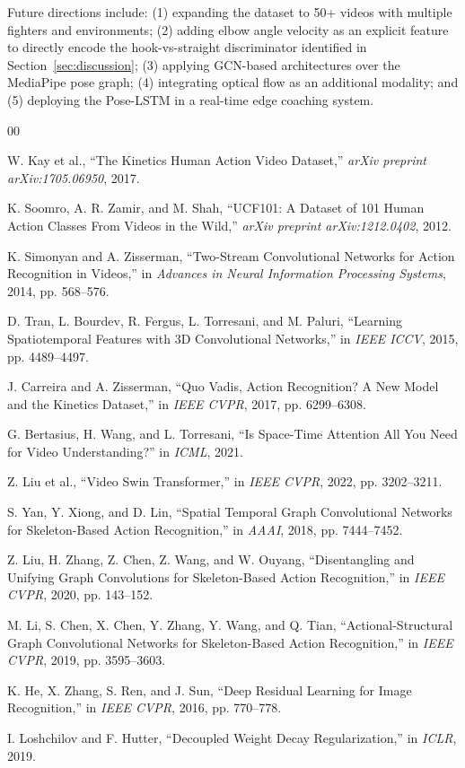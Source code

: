 \documentclass[conference]{IEEEtran}
\begin{document}
Future directions include: (1) expanding the dataset to 50+ videos with
multiple fighters and environments; (2) adding elbow angle velocity as an
explicit feature to directly encode the hook-vs-straight discriminator
identified in Section~\ref{sec:discussion}; (3) applying GCN-based
architectures over the MediaPipe pose graph; (4) integrating optical flow as
an additional modality; and (5) deploying the Pose-LSTM in a real-time edge
coaching system.

\begin{thebibliography}{00}

W. Kay et al., ``The Kinetics Human Action Video Dataset,''
\textit{arXiv preprint arXiv:1705.06950}, 2017.

K. Soomro, A. R. Zamir, and M. Shah, ``UCF101: A Dataset of 101 Human Action
Classes From Videos in the Wild,'' \textit{arXiv preprint arXiv:1212.0402},
2012.

K. Simonyan and A. Zisserman, ``Two-Stream Convolutional Networks for Action
Recognition in Videos,'' in \textit{Advances in Neural Information Processing
Systems}, 2014, pp. 568--576.

D. Tran, L. Bourdev, R. Fergus, L. Torresani, and M. Paluri, ``Learning
Spatiotemporal Features with 3D Convolutional Networks,'' in \textit{IEEE
ICCV}, 2015, pp. 4489--4497.

J. Carreira and A. Zisserman, ``Quo Vadis, Action Recognition? A New Model
and the Kinetics Dataset,'' in \textit{IEEE CVPR}, 2017, pp. 6299--6308.

G. Bertasius, H. Wang, and L. Torresani, ``Is Space-Time Attention All You
Need for Video Understanding?'' in \textit{ICML}, 2021.

Z. Liu et al., ``Video Swin Transformer,'' in \textit{IEEE CVPR}, 2022,
pp. 3202--3211.

S. Yan, Y. Xiong, and D. Lin, ``Spatial Temporal Graph Convolutional Networks
for Skeleton-Based Action Recognition,'' in \textit{AAAI}, 2018,
pp. 7444--7452.

Z. Liu, H. Zhang, Z. Chen, Z. Wang, and W. Ouyang, ``Disentangling and
Unifying Graph Convolutions for Skeleton-Based Action Recognition,'' in
\textit{IEEE CVPR}, 2020, pp. 143--152.

M. Li, S. Chen, X. Chen, Y. Zhang, Y. Wang, and Q. Tian,
``Actional-Structural Graph Convolutional Networks for Skeleton-Based Action
Recognition,'' in \textit{IEEE CVPR}, 2019, pp. 3595--3603.

K. He, X. Zhang, S. Ren, and J. Sun, ``Deep Residual Learning for Image
Recognition,'' in \textit{IEEE CVPR}, 2016, pp. 770--778.

I. Loshchilov and F. Hutter, ``Decoupled Weight Decay Regularization,'' in
\textit{ICLR}, 2019.

\end{thebibliography}
\end{document}
